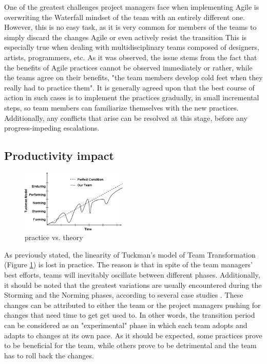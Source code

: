 \documentclass{scrartcl}
\begin{document}
    One of the greatest challenges project managers face when implementing Agile is overwriting the Waterfall mindset of the team with an entirely different one. However, this is no easy task, as it is very common for members of the teams to simply discard the changes Agile or even actively resist the transition \cite{MtnGoat} This is especially true when dealing with multidisciplinary teams composed of designers, artists, programmers, etc. As it was observed, the issue stems from the fact that the benefits of Agile practices cannot be observed immediately or rather, while the teams agree on their benefits, "the team members develop cold feet when they really had to practice them"\cite{4599456}. It is generally agreed upon that the best course of action in such cases is to implement the practices gradually, in small incremental steps, so team members can familiarize themselves with the new practices\cite{4293601, 4599458}. Additionally, any conflicts that arise can be resolved at this stage, before any progress-impeding escalations.
    
    \newpage
    
    \subsection{Productivity impact}
    
    \begin{figure}
        \centering
        \includegraphics[width=0.45\textwidth]{tuckman.jpg}
        \caption{practice vs. theory}
        \label{fig:tuckman}
    \end{figure}
    
    As previously stated, the linearity of Tuckman's model of Team Transformation (Figure \ref{fig:tuckman}) is lost in practice. The reason is that in spite of the team managers' best efforts, teams will inevitably oscillate between different phases. Additionally, it should be noted that the greatest variations are usually encountered during the Storming and the Norming phases, according to several case studies \cite{4599456, 4599458}. These changes can be attributed to either the team or the project managers pushing for changes that need time to get get used to. In other words, the transition period can be considered as an "experimental" phase in which each team adopts and adapts to changes at its own pace. As it should be expected, some practices prove to be beneficial for the team, while others prove to be detrimental and the team has to roll back the changes. \\
    
\end{document}
